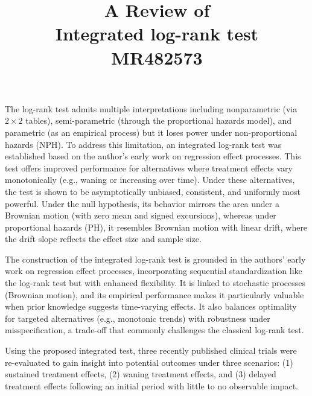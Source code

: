 \documentclass[11pt]{article}
\title{A Review of \\ Integrated log-rank test \\MR482573}
\begin{document}
	\maketitle	
	
The log-rank test admits multiple interpretations including nonparametric (via $2\times 2$ tables), semi-parametric (through the proportional hazards model), and parametric (as an empirical process) but it loses power under non-proportional hazards (NPH). To address this limitation,  an integrated log-rank test was established based on the author’s early work on regression effect processes. This test offers improved performance for alternatives where treatment effects vary monotonically (e.g., waning or increasing over time). Under these alternatives, the test is shown to be asymptotically unbiased, consistent, and uniformly most powerful. Under the null hypothesis, its behavior mirrors the area under a Brownian motion (with zero mean and signed excursions), whereas under proportional hazards (PH), it resembles Brownian motion with linear drift, where the drift slope reflects the effect size and sample size.

The construction of the integrated log-rank test is grounded in the authors’ early work on regression effect processes, incorporating sequential standardization like the log-rank test but with enhanced flexibility. It is linked to stochastic processes (Brownian motion), and its empirical performance makes it particularly valuable when prior knowledge suggests time-varying effects. It also balances optimality for targeted alternatives (e.g., monotonic trends) with robustness under misspecification, a trade-off that commonly challenges the classical log-rank test.

Using the proposed integrated test, three recently published clinical trials were re-evaluated to gain insight into potential outcomes under three scenarios: (1) sustained treatment effects, (2) waning treatment effects, and (3) delayed treatment effects following an initial period with little to no observable impact.
\end{document}
